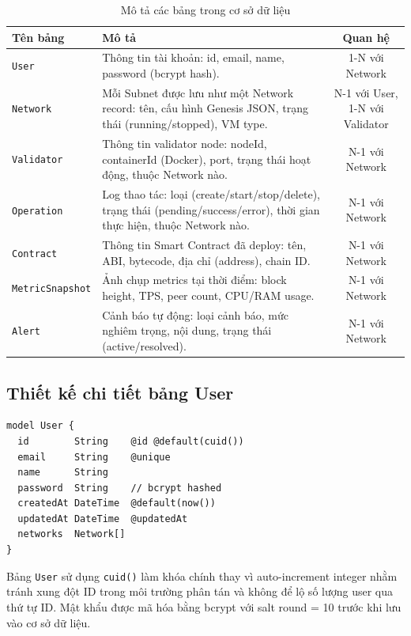 \begin{table}[H]
\centering
\caption{Mô tả các bảng trong cơ sở dữ liệu}
\label{tab:database_tables}
\begin{tabular}{|l|p{8cm}|c|}
\hline
\textbf{Tên bảng} & \textbf{Mô tả} & \textbf{Quan hệ} \\ \hline
\texttt{User} & Thông tin tài khoản: id, email, name, password (bcrypt hash). & 1-N với Network \\ \hline
\texttt{Network} & Mỗi Subnet được lưu như một Network record: tên, cấu hình Genesis JSON, trạng thái (running/stopped), VM type. & N-1 với User, 1-N với Validator \\ \hline
\texttt{Validator} & Thông tin validator node: nodeId, containerId (Docker), port, trạng thái hoạt động, thuộc Network nào. & N-1 với Network \\ \hline
\texttt{Operation} & Log thao tác: loại (create/start/stop/delete), trạng thái (pending/success/error), thời gian thực hiện, thuộc Network nào. & N-1 với Network \\ \hline
\texttt{Contract} & Thông tin Smart Contract đã deploy: tên, ABI, bytecode, địa chỉ (address), chain ID. & N-1 với Network \\ \hline
\texttt{MetricSnapshot} & Ảnh chụp metrics tại thời điểm: block height, TPS, peer count, CPU/RAM usage. & N-1 với Network \\ \hline
\texttt{Alert} & Cảnh báo tự động: loại cảnh báo, mức nghiêm trọng, nội dung, trạng thái (active/resolved). & N-1 với Network \\ \hline
\end{tabular}
\end{table}

\subsection{Thiết kế chi tiết bảng User}

\begin{lstlisting}[caption={Prisma Schema --- Model User}, label={lst:prisma_user}, language={}]
model User {
  id        String    @id @default(cuid())
  email     String    @unique
  name      String
  password  String    // bcrypt hashed
  createdAt DateTime  @default(now())
  updatedAt DateTime  @updatedAt
  networks  Network[]
}
\end{lstlisting}

Bảng \texttt{User} sử dụng \texttt{cuid()} làm khóa chính thay vì auto-increment integer nhằm tránh xung đột ID trong môi trường phân tán và không để lộ số lượng user qua thứ tự ID. Mật khẩu được mã hóa bằng bcrypt với salt round = 10 trước khi lưu vào cơ sở dữ liệu.

